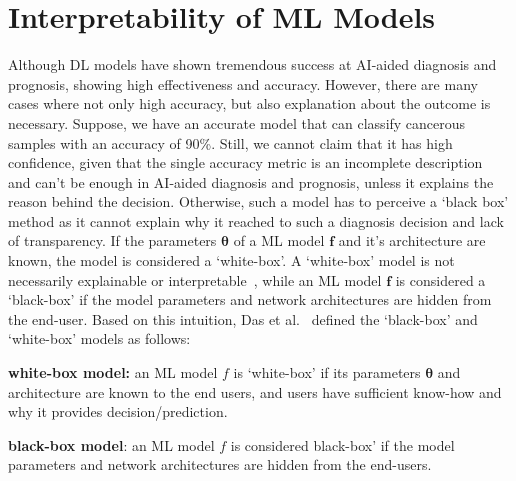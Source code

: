 \section{Interpretability of ML Models}
Although DL models have shown tremendous success at AI-aided diagnosis and prognosis, showing high effectiveness and accuracy. However, there are many cases where not only high accuracy, but also explanation about the outcome is necessary. Suppose, we have an accurate model that can classify cancerous samples with an accuracy of 90\%. Still, we cannot claim that it has high confidence, given that the single accuracy metric is an incomplete description~\cite{doshi2017towards} and can't be enough in AI-aided diagnosis and prognosis, unless it explains the reason behind the  decision. Otherwise, such a model has to perceive a `black box' method as it cannot explain why it reached to such a diagnosis decision and lack of transparency.  
If the parameters $\boldsymbol{\theta}$ of a ML model $\boldsymbol{f}$ and it's architecture are known, the model is considered a `white-box'. %
A `white-box' model is not necessarily explainable or interpretable~\cite{das2020opportunities}, while an ML model $\boldsymbol{f}$ is considered a `black-box' if the model parameters and network architectures are hidden from the end-user. Based on this intuition, Das et al.~\cite{das2020opportunities} defined the `black-box' and `white-box' models as follows: 

\begin{definition}
    \textbf{white-box model:} an ML model $f$ is `white-box' if its parameters $\boldsymbol{\theta}$ and architecture are known to the end users, and users have sufficient know-how and why it provides decision/prediction.  
\end{definition}

\begin{definition}
    \textbf{black-box model}: an ML model $f$ is considered black-box' if the model parameters and network architectures are hidden from the end-users. 
\end{definition}

